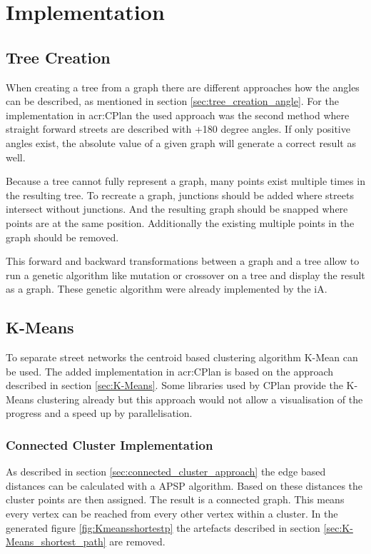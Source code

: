 \pagebreak
\chapter{Implementation}
\section{Tree Creation}
When creating a tree from a graph there are different approaches how the angles can be described, as mentioned in section \ref{sec:tree_creation_angle}. For the implementation in \acrshort{acr:CPlan} the used approach was the second method where straight forward streets are described with +180 degree angles. If only positive angles exist, the absolute value of a given graph will generate a correct result as well.

Because a tree cannot fully represent a graph, many points exist multiple times in the resulting tree. To recreate a graph, junctions should be added where streets intersect without junctions. And the resulting graph should be snapped where points are at the same position. Additionally the existing multiple points in the graph should be removed.

This forward and backward transformations between a graph and a tree allow to run a genetic algorithm like mutation or crossover on a tree and display the result as a graph. These genetic algorithm were already implemented by the \gls{iA}.

\pagebreak
\section{K-Means}
To separate street networks the centroid based clustering algorithm K-Mean can be used. The added implementation in \acrshort{acr:CPlan} \citep{cPlan:2015} is based on the approach described in section \ref{sec:K-Means}. Some libraries used by CPlan provide the K-Means clustering already but this approach would not allow a visualisation of the progress and a speed up by parallelisation.

\subsection{Connected Cluster Implementation} \label{sec:K-Means_shortest_path_impl}
As described in section \ref{sec:connected_cluster_approach} the edge based distances can be calculated with a \gls{APSP} algorithm. Based on these distances the cluster points are then assigned. The result is a connected graph. This means every vertex can be reached from every other vertex within a cluster. In the generated figure \ref{fig:Kmeansshortestp} the artefacts described in section \ref{sec:K-Means_shortest_path} are removed.

